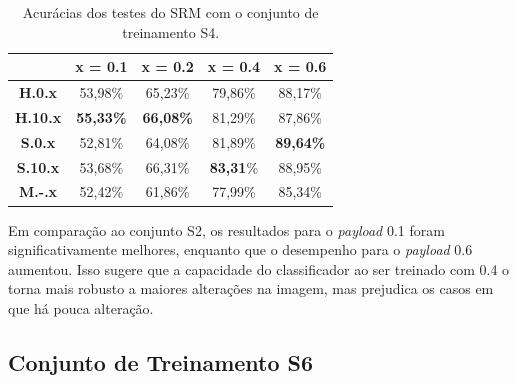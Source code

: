 \begin{table}[!htb]
\centering
\begin{tabular}{c|c|c|c|c|}
\cline{2-5}
\textbf{}                             & \textbf{x = 0.1} & \textbf{x = 0.2} & \textbf{x = 0.4} & \textbf{x = 0.6} \\ \hline
\multicolumn{1}{|c|}{\textbf{H.0.x}}  & 53,98\%          & 65,23\%          & 79,86\%          & 88,17\%          \\ \hline
\multicolumn{1}{|c|}{\textbf{H.10.x}} & \textbf{55,33\%} & \textbf{66,08\%} & 81,29\% & 87,86\% \\ \hline
\multicolumn{1}{|c|}{\textbf{S.0.x}}  & 52,81\%          & 64,08\%          & 81,89\%          & \textbf{89,64\%}          \\ \hline
\multicolumn{1}{|c|}{\textbf{S.10.x}} & 53,68\%          & 66,31\%          & \textbf{83,31}\%          & 88,95\%          \\ \hline
\multicolumn{1}{|c|}{\textbf{M.-.x}}  & 52,42\%          & 61,86\%          & 77,99\%          & 85,34\%          \\ \hline
\end{tabular}
\caption{Acurácias dos testes do SRM com o conjunto de treinamento S4.}
\label{tab:suni_s4}

\end{table}

Em comparação ao conjunto S2, os resultados para o \textit{payload} 0.1 foram significativamente melhores, enquanto que o desempenho para o \textit{payload} 0.6 aumentou. Isso sugere que a capacidade do classificador ao ser treinado com 0.4 o torna mais robusto a maiores alterações na imagem, mas prejudica os casos em que há pouca alteração.

\subsection{Conjunto de Treinamento S6}

